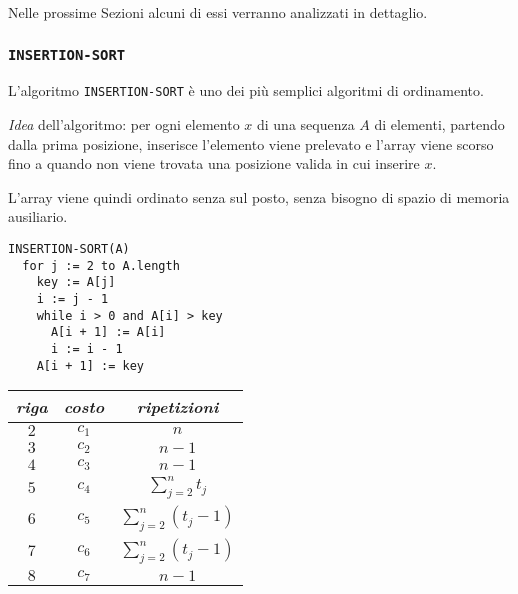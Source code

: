 \documentclass[italian, 10pt]{article}
\begin{document}
\bigskip
Nelle prossime Sezioni alcuni di essi verranno analizzati in dettaglio.

\subsubsection{\texttt{INSERTION-SORT}}

L'algoritmo \texttt{INSERTION-SORT} è uno dei più semplici algoritmi di ordinamento.

\textit{Idea} dell'algoritmo:
per ogni elemento \(x\) di una sequenza \(A\) di elementi, partendo dalla prima posizione, inserisce l'elemento viene prelevato e l'array viene scorso fino a quando non viene trovata una posizione valida in cui inserire \(x\).

L'array viene quindi ordinato senza sul posto, senza bisogno di spazio di memoria ausiliario.

  \begin{minipage}{0.45\textwidth}
    \begin{lstlisting}[style=pseudocode, label={Pseudocodice dell'algoritmo di Insertion Sort}, label={lst:pseudocodice-insertion-sort}]
INSERTION-SORT(A)
  for j := 2 to A.length
    key := A[j]
    i := j - 1
    while i > 0 and A[i] > key
      A[i + 1] := A[i]
      i := i - 1
    A[i + 1] := key
    \end{lstlisting}
  \end{minipage}
  \begin{minipage}{0.45\textwidth}
    \centering
    \begin{tabular}{ccc}
      \textit{riga} & \textit{costo} & \textit{ripetizioni}     \\ \hline
      \(2\)         & \(c_1\)        & \(n\)                    \\
      \(3\)         & \(c_2\)        & \(n-1\)                  \\
      \(4\)         & \(c_3\)        & \(n-1\)                  \\
      \(5\)         & \(c_4\)        & \(\sum_{j=2}^n t_j\)     \\
      \(6\)         & \(c_5\)        & \(\sum_{j=2}^n (t_j-1)\) \\
      \(7\)         & \(c_6\)        & \(\sum_{j=2}^n (t_j-1)\) \\
      \(8\)         & \(c_7\)        & \(n-1\)                  \\
    \end{tabular}
  \end{minipage}
\end{document}
